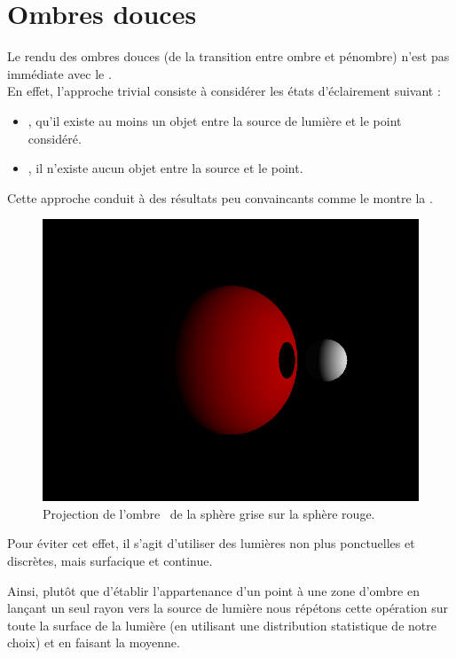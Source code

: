 \section{Ombres douces\label{sec:softshadows}}
Le rendu des ombres douces (\ie de la transition entre ombre et pénombre)
n'est pas immédiate avec le .\\

En effet, l'approche trivial consiste à considérer les états d'éclairement
suivant :
\begin{itemize}
  \item {}, \ie qu'il existe au moins un objet entre la source
    de lumière et le point considéré.
  \item {}, \ie il n'existe aucun objet entre la source et
    le point.
\end{itemize}

Cette approche conduit à des résultats peu convaincants comme le montre la
.

\begin{figure}[h]
  \includegraphics[width=\textwidth, keepaspectratio=true]{../../diary/06.png}
  \caption{Projection de l'ombre \ de la sphère grise sur la sphère
  rouge.\label{fig:hardshadow}}
\end{figure}

Pour éviter cet effet, il s'agit d'utiliser des lumières non plus ponctuelles
et discrètes, mais surfacique et continue.

Ainsi, plutôt que d'établir l'appartenance d'un point à une zone d'ombre en
lançant un seul rayon vers la source de lumière nous répétons cette opération
sur toute la surface de la lumière (en utilisant une distribution statistique
de notre choix) et en faisant la moyenne.

